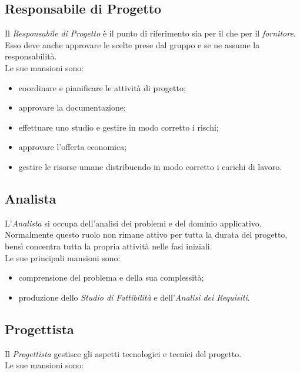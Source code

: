 \documentclass[../NormediProgetto.tex]{subfiles}
\begin{document}
	\subsection {Responsabile di Progetto}
	
	Il \textit{Responsabile di Progetto} è il punto di riferimento sia per il  che per il \textit{fornitore}. Esso deve anche approvare le scelte prese dal gruppo e se ne assume la responsabilità. 
	\\ \noindent Le sue mansioni sono:
	
	\begin{itemize}
		\item coordinare e pianificare le attività di progetto;
		\item approvare la documentazione;
		\item effettuare uno studio e gestire in modo corretto i rischi;
		\item approvare l'offerta economica;
		\item gestire le risorse umane distribuendo in modo corretto i carichi di lavoro.
	\end{itemize}
	
	\subsection {Analista}
	
	L'\textit{Analista} si occupa dell'analisi dei problemi e del dominio applicativo. Normalmente questo ruolo non rimane attivo per tutta la durata del progetto, bensì concentra tutta la propria attività nelle fasi iniziali.
	\\ \noindent Le sue principali mansioni sono:
	
	\begin{itemize}
		\item comprensione del problema e della sua complessità;
		\item produzione dello \textit{Studio di Fattibilità} e dell'\textit{Analisi dei Requisiti}.
	\end{itemize}
	
	\subsection {Progettista}
	
	Il \textit{Progettista} gestisce gli aspetti tecnologici e tecnici del progetto.
	\\ \noindent Le sue mansioni sono:
	
\end{document}

